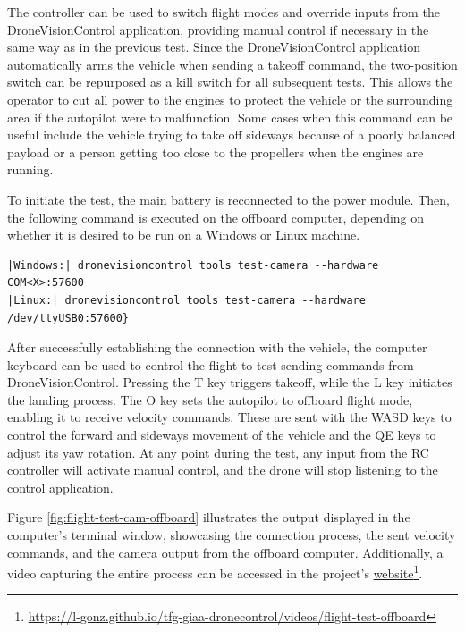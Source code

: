 The controller can be used to switch flight modes and override inputs from the DroneVisionControl application, providing manual control if necessary in the same way as in the previous test. Since the DroneVisionControl application automatically arms the vehicle when sending a takeoff command, the two-position switch can be repurposed as a kill switch for all subsequent tests. This allows the operator to cut all power to the engines to protect the vehicle or the surrounding area if the autopilot were to malfunction. Some cases when this command can be useful include the vehicle trying to take off sideways because of a poorly balanced payload or a person getting too close to the propellers when the engines are running.

To initiate the test, the main battery is reconnected to the power module. Then, the following command is executed on the offboard computer, depending on whether it is desired to be run on a Windows or Linux machine.


\begin{verbatim}
|Windows:| dronevisioncontrol tools test-camera --hardware COM<X>:57600
|Linux:| dronevisioncontrol tools test-camera --hardware /dev/ttyUSB0:57600}
\end{verbatim}


After successfully establishing the connection with the vehicle, the computer keyboard can be used to control the flight to test sending commands from DroneVisionControl. Pressing the T key triggers takeoff, while the L key initiates the landing process. The O key sets the autopilot to offboard flight mode, enabling it to receive velocity commands. These are sent with the WASD keys to control the forward and sideways movement of the vehicle and the QE keys to adjust its yaw rotation. At any point during the test, any input from the RC controller will activate manual control, and the drone will stop listening to the control application.

Figure \ref{fig:flight-test-cam-offboard} illustrates the output displayed in the computer's terminal window, showcasing the connection process, the sent velocity commands, and the camera output from the offboard computer. Additionally, a video capturing the entire process can be accessed in the project's \href{https://l-gonz.github.io/tfg-giaa-dronecontrol/videos/flight-test-offboard}{website}\footnote{\url{https://l-gonz.github.io/tfg-giaa-dronecontrol/videos/flight-test-offboard}}.

